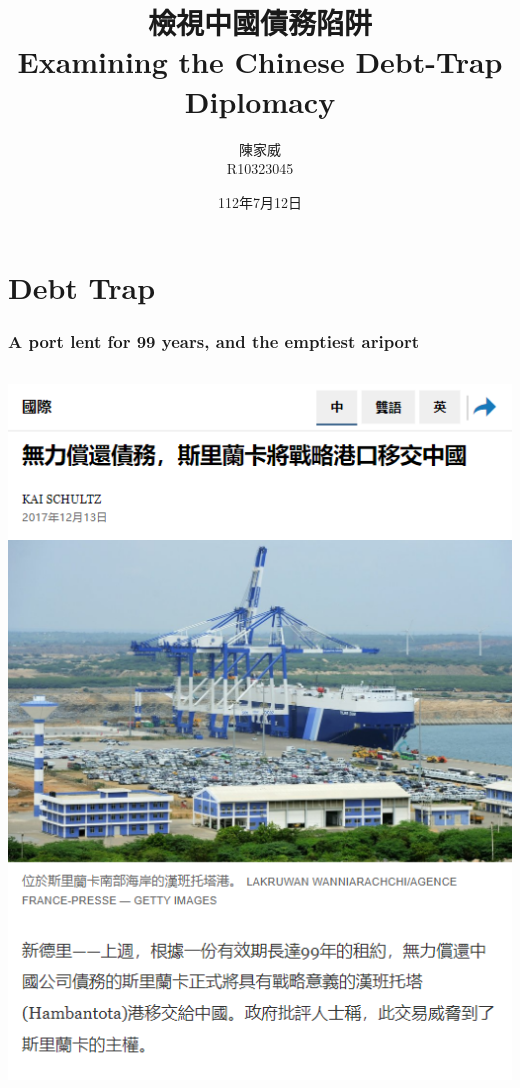 \documentclass[mathserif]{beamer}
\title{檢視中國債務陷阱\\Examining the Chinese Debt-Trap Diplomacy}
\author{陳家威\\{\small R10323045}}
\date{112年7月12日}
\begin{document}
    \begin{frame}

        \maketitle

    \end{frame}

    \section{Debt Trap}

    \begin{frame}
        \frametitle{A port lent for 99 years, and the emptiest ariport}
        \begin{columns}
            \begin{column}{0.48\textwidth}
                    \includegraphics[width = \textwidth]{fig/Hambontota_news.png}

\end{column}
\end{columns}
\end{frame}
\end{document}
